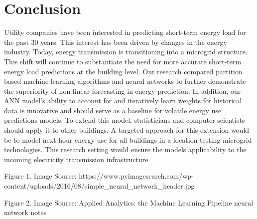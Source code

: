\documentclass[twoside,11pt]{article}
\begin{document}
\section{Conclusion} 
Utility companies have been interested in predicting short-term energy load for the past 30 years. This interest has been driven by changes in the energy industry. Today, energy transmission is transitioning into a microgrid structure. This shift will continue to substantiate the need for more accurate short-term energy load predictions at the building level. Our research compared partition based machine learning algorithms and neural networks to further demonstrate the superiority of non-linear forecasting in energy prediction. In addition, our ANN model's ability to account for and iteratively learn weights for historical data is innovative and should serve as a baseline for volatile energy use predictions models. To extend this model, statisticians and computer scientists should apply it to other buildings. A targeted approach for this extension would be to model next hour energy-use for all buildings in a location testing microgrid technologies. This research setting would ensure the models applicability to the incoming electricity transmission infrastructure. 



\indent Figure 1. Image Source: https://www.pyimagesearch.com/wp-content/uploads/2016/08/simple_neural_network_header.jpg

Figure 2. Image Source: Applied Analytics: the Machine Learning Pipeline neural network notes
\appendix
\end{document}
